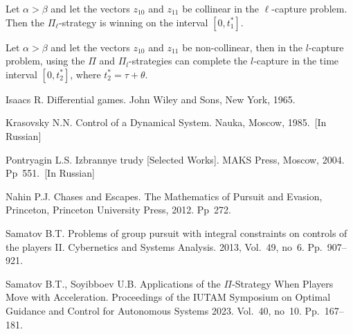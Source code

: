 \documentclass[12pt]{llncs}
\begin{document}
\begin{theorem}
Let $\alpha>\beta$ and let the vectors $z_{10}$ and $z_{11}$ be collinear in the $\ell$-capture problem. Then the $\Pi_\ell$-strategy is winning on the interval $[0, t^{*}_{1}]$.
\end{theorem}
\begin{theorem}
Let $\alpha>\beta$ and let the vectors $z_{10}$ and $z_{11}$ be non-collinear, then in the $l$-capture problem, using the $\Pi$ and $\Pi_l$-strategies can complete the $l$-capture in the time interval $[0,t^{*}_{2}]$, where $t^{*}_{2}=\tau+\theta$.
\end{theorem}
\begin{thebibliography}{9} %
 Isaacs R. Differential games. John Wiley and Sons, New York, 1965.

 Krasovsky N.N. Control of a Dynamical System. Nauka, Moscow, 1985.~[In Russian]

  Pontryagin L.S. Izbrannye trudy [Selected Works]. MAKS Press, Moscow, 2004. Pp~551.~[In Russian]

 Nahin P.J. Chases and Escapes. The Mathematics of Pursuit and Evasion, Princeton, Princeton University Press, 2012. Pp~272.

 Samatov B.T. Problems of group pursuit with integral constraints on controls of the players II. Cybernetics and
Systems Analysis. 2013, Vol.~49, no~6. Pp.~907--921.

 Samatov B.T., Soyibboev U.B. Applications of the $\Pi$-Strategy When Players Move with Acceleration. Proceedings of the IUTAM Symposium on Optimal Guidance and Control for Autonomous Systems 2023. Vol.~40, no~10. Pp.~167--181.

\end{thebibliography}
\end{document}
